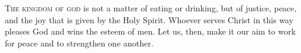 
\lettrine{T}{he kingdom of god} is not a matter of eating or drinking, but of justice, peace, and the joy that is given by the Holy Spirit. Whoever serves Christ in this way pleases God and wins the esteem of men. Let us, then, make it our aim to work for peace and to strengthen one another.
